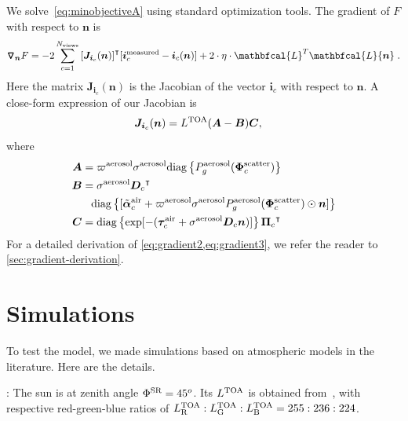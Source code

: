 \documentclass[10pt,letterpaper]{article}
\newcommand{\Laplacian}{\mathbfcal{L}}
\newcommand{\OpDiag}[1]{\mathrm{diag}\left\{#1\right\}}
\newcommand{\Grad}[1]{\bm{\triangledown_{#1}}}
\newcommand{\vect}[1]{\bm{#1}}
\newcommand{\transpose}[1]{{#1}^\intercal}
\begin{document}
We solve~\cref{eq:minobjectiveA} using standard optimization tools.
The gradient of $F$ with respect to ${\bm n}$ is
\begin{align}
  \Grad{{\bm n}} F = -2\sum_{c=1}^{N_{\rm views}}
  \transpose{\left[{\bm J}_{{\bm i}_c}({\bm n})\right]} [{\bm i}^{\rm
    measured}_c - {\bm i}_c({\bm n})] + 2 \cdot \eta \cdot
  \Laplacian^T\Laplacian{\bm n} \;.
  \label{eq:gradient1}
\end{align}
Here the matrix ${\bm J}_{{\bm i}_c}({\bm n})$ is the Jacobian of the
vector ${\bm i}_c$ with respect to ${\bm n}$. A close-form expression of
our Jacobian is
\begin{align}
  {\bm J}_{{\bm i}_c}({\bm n}) &= L^{\rm TOA}({\bm A}-{\bm B}){\bm C}
  ,
  \label{eq:gradient2}
\end{align}
where
\begin{align}
  \label{eq:gradient3}
  {\bm A} &= \varpi^{\rm aerosol}\sigma^{\rm aerosol}
  \OpDiag{ P_g^{\rm aerosol}(\vect{\Phi}^{\rm scatter}_c)} \nonumber\\
  {\bm B} &= {\sigma}^{\rm aerosol}\transpose{{\bm D}_c} \nonumber\\
  & \;\;\; \OpDiag{[\tilde{\vect{\alpha}}^{\rm air}_c + \varpi^{\rm
      aerosol}\sigma^{\rm aerosol} P^{\rm aerosol}_g(\vect{\Phi}^{\rm
      scatter}_c) \odot{\bm n}
    ]} \nonumber \\
  {\bm C} &= \OpDiag{\exp[-(\vect{\tau}_c^{\rm air} + {\sigma}^{\rm
      aerosol} {\bm D}_c {\bm n})]} \transpose{{\vect{\Pi}}_c}
\end{align}
For a detailed derivation of \cref{eq:gradient2,eq:gradient3}, we
refer the reader to \cref{sec:gradient-derivation}.


\section{Simulations}
\label{sec:simul}

To test the model, we made simulations based on atmospheric models in
the literature. Here are the details.

: The sun is at zenith angle $\Phi^{\rm
  SR}=45^o$. Its $L^{\rm TOA}$ is obtained
from~\cite{BBradiance,sun_composition}, with respective red-green-blue
ratios of $L^{\rm TOA}_{\rm R}:L^{\rm TOA}_{\rm G}:L^{\rm TOA}_{\rm
  B}=255:236:224$.
\end{document}
